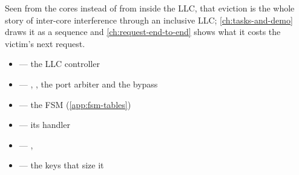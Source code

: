 Seen from the cores instead of from inside the LLC, that eviction is the whole story of
inter-core interference through an inclusive LLC; \cref{ch:tasks-and-demo} draws it as a
sequence and \cref{ch:request-end-to-end} shows what it costs the victim's next request.

\begin{wherebox}
\begin{itemize}[nosep,leftmargin=1.2em]
\item {} --- the LLC controller
\item {} --- , , the port arbiter and the bypass
\item {} --- the FSM (\cref{app:fsm-tables})
\item {} --- its handler
\item {} --- , 
\item {} --- the  keys that size it
\end{itemize}
\end{wherebox}
